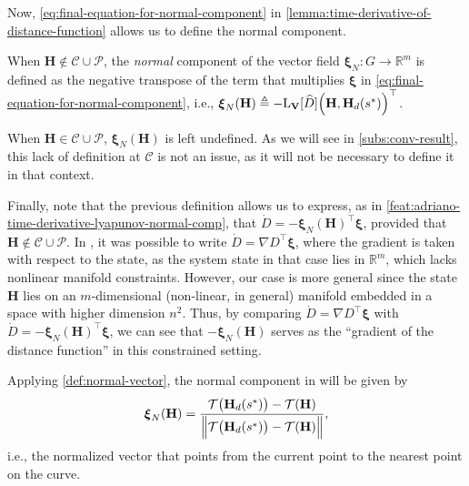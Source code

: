 Now, \eqref{eq:final-equation-for-normal-component} in \cref{lemma:time-derivative-of-distance-function} allows us to define the normal component. 
\begin{definition}  \label{def:normal-vector}
    When $\mathbf{H} \not \in \mathcal{C} \cup \mathcal{P}$, the \emph{normal} component of the vector field $\boldsymbol{\xi}_N: G\to\mathbb{R}^m$ is defined as the negative transpose of the term that multiplies $\boldsymbol{\xi}$ in \eqref{eq:final-equation-for-normal-component}, i.e., $\boldsymbol{\xi}_N(\mathbf{H}) \triangleq -\text{L}_{\mathbf{V}}[\widehat{D}]\Bigl(\mathbf{H}, \mathbf{H}_d(s^*)\Bigr)^{\top}$.
    
    
\end{definition}
When $\mathbf{H} \in \mathcal{C} \cup \mathcal{P}$, $\boldsymbol{\xi}_N(\mathbf{H})$ is left undefined. As we will see in \cref{subs:conv-result}, this lack of definition at $\mathcal{C}$ is not an issue, as it will not be necessary to define it in that context. 

Finally, note that the previous definition allows us to express, as in \cref{feat:adriano-time-derivative-lyapunov-normal-comp}, that $\dot{D} = -\boldsymbol{\xi}_N(\mathbf{H})^{\top}\boldsymbol{\xi}$, provided that $\mathbf{H} \not \in \mathcal{C} \cup \mathcal{P}$. In \citet{Rezende2022}, it was possible to write $\dot{D} = \nabla D^{\top} \boldsymbol{\xi}$, where the gradient is taken with respect to the state, as the system state in that case lies in $\mathbb{R}^m$, which lacks nonlinear manifold constraints. However, our case is more general since the state $\mathbf{H}$ lies on an $m$-dimensional (non-linear, in general) manifold embedded in a space with higher dimension $n^2$. Thus, by comparing $\dot{D} = \nabla D^{\top} \boldsymbol{\xi}$ with $\dot{D} = -\boldsymbol{\xi}_N(\mathbf{H})^{\top}\boldsymbol{\xi}$, we can see that $-\boldsymbol{\xi}_N(\mathbf{H})$ serves as the ``gradient of the distance function'' in this constrained setting.

\begin{example}\label{example:xi_N_rezende}
    Applying \cref{def:normal-vector}, the normal component in \citet{Rezende2022} will be given by
    \begin{align*}
        \boldsymbol{\xi}_{N}(\mathbf{H})= \frac{\mathcal{T}\bigl(\mathbf{H}_d(s^*)\bigr) - \mathcal{T}(\mathbf{H})}{\Bigl\|\mathcal{T}\bigl(\mathbf{H}_d(s^*)\bigr) - \mathcal{T}(\mathbf{H})\Bigr\|},  
    \end{align*}
     i.e., the normalized vector that points from the current point to the nearest point on the curve.
\end{example}
